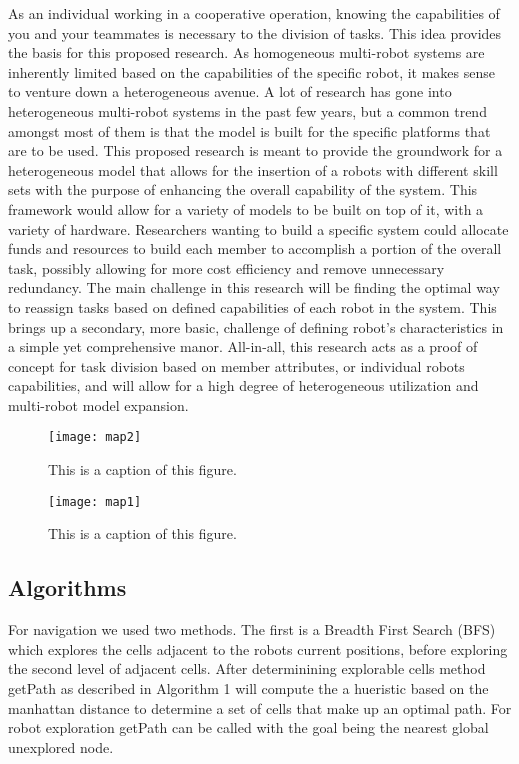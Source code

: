As an individual working in a cooperative operation, knowing the capabilities
of you and your teammates is necessary to the division of tasks. This idea
provides the basis for this proposed research. As homogeneous multi-robot systems
are inherently limited based on the capabilities of the specific robot,
it makes sense to venture down a heterogeneous avenue. A lot of research
has gone into heterogeneous multi-robot systems in the past few years, but a
common trend amongst most of them is that the model is built for the specific
platforms that are to be used. This proposed research is meant to provide the
groundwork for a heterogeneous model that allows for the insertion of a
robots with different skill sets with the purpose of enhancing the overall
capability of the system. This framework would allow for a variety of models
to be built on top of it, with a variety of hardware. Researchers wanting to
build a specific system could allocate funds and resources to build each member
to accomplish a portion of the overall task, possibly allowing for more cost
efficiency and remove unnecessary redundancy. The main challenge in this
research will be finding the optimal way to reassign tasks based on defined
capabilities of each robot in the system. This brings up a secondary, more basic,
challenge of defining robot’s characteristics in a simple yet comprehensive manor.
All-in-all, this research acts as a proof of concept for task division based on member
attributes, or individual robots capabilities, and will allow for a high degree of
heterogeneous utilization and multi-robot model expansion.

\begin{figure}[H]
  \centering
    \texttt{[image: map2]}
  \caption{This is a caption of this figure.}
  \label{fig:something1}
\end{figure}

\begin{figure}[H]
  \centering
    \texttt{[image: map1]}
  \caption{This is a caption of this figure.}
  \label{fig:something2}
\end{figure}

\subsection{Algorithms}
For navigation we used two methods. The first is a Breadth First Search (BFS) which explores the cells adjacent to the robots
current positions, before exploring the second level of adjacent cells. After determinining explorable cells method getPath as described in Algorithm 1 will compute the a hueristic based on the manhattan distance to determine a set of cells that make up an optimal path. For robot exploration getPath can be called with the goal being the nearest global unexplored node\cite{pound}.


